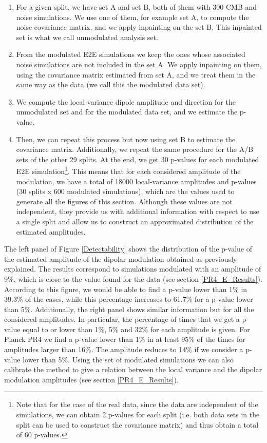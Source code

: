 \begin{enumerate}
    \item For a given split, we have set A and set B, both of them with 300 CMB and noise simulations. We use one of them, for example set A, to compute the noise covariance matrix, and we apply inpainting on the set B. This inpainted set is what we call unmodulated analysis set.
    \item From the modulated E2E simulations we keep the ones whose associated noise simulations are not included in the set A. We apply inpainting on them, using the covariance matrix estimated from set A, and we treat them in the same way as the data (we call this the modulated data set).
    \item We compute the local-variance dipole amplitude and direction for the unmodulated set and for the modulated data set, and we estimate the p-value.
    \item Then, we can repeat this process but now using set B to estimate the covariance matrix. Additionally, we repeat the same procedure for the A/B sets of the other 29 splits. At the end, we get 30 p-values for each modulated E2E simulation\footnote{Note that for the case of the real data, since the data are independent of the simulations, we can obtain 2 p-values for each split (i.e. both data sets in the split can be used to construct the covariance matrix) and thus obtain a total of 60 p-values.}. This means that for each considered amplitude of the modulation, we have a total of 18000 local-variance amplitudes and p-values (30 splits x 600 modulated simulations), which are the values used to generate all the figures of this section. Although these values are not independent, they provide us with additional information with respect to use a single split and allow us to construct an approximated distribution of the estimated amplitudes.
\end{enumerate}
 
The left panel of Figure \ref{Detectability} shows the distribution of the p-value of the estimated amplitude of the dipolar modulation obtained as previously explained. The results correspond to simulations modulated with an amplitude of 9\%, which is close to the value found for the data (see section \ref{PR4_E_Results}). According to this figure, we would be able to find a p-value lower than 1\% in 39.3\% of the cases, while this percentage increases to 61.7\% for a p-value lower than 5\%. Additionally, the right panel shows similar information but for all the considered amplitudes. In particular, the percentage of times that we get
a p-value equal to or lower than 1\%, 5\% and 32\% for each amplitude is given. For Planck PR4 we find a p-value lower than 1\% in at least 95\% of the times for amplitudes larger than 16\%. The amplitude reduces to 14\% if we consider a p-value lower than 5\%. 
Using the set of modulated simulations we can also calibrate the method to give a relation between the local variance and the dipolar modulation amplitudes (see section \ref{PR4_E_Results}).

